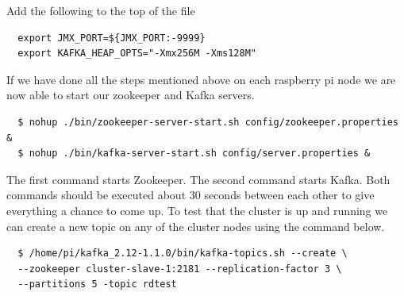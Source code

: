 Add the following to the top of the file

\begin{verbatim}
  export JMX_PORT=${JMX_PORT:-9999}
  export KAFKA_HEAP_OPTS="-Xmx256M -Xms128M"
\end{verbatim}

If we have done all the steps mentioned above on each raspberry pi node we are now able to start our zookeeper and Kafka servers.

\begin{verbatim}
  $ nohup ./bin/zookeeper-server-start.sh config/zookeeper.properties & 
  $ nohup ./bin/kafka-server-start.sh config/server.properties &
\end{verbatim}

The first command starts Zookeeper. The second command starts Kafka. Both commands should be executed about 30 seconds between each other to give everything a chance to come up. To test that the cluster is up and running we can create a new topic on any of the cluster nodes using the command below.

\begin{verbatim}
  $ /home/pi/kafka_2.12-1.1.0/bin/kafka-topics.sh --create \
  --zookeeper cluster-slave-1:2181 --replication-factor 3 \
  --partitions 5 -topic rdtest
\end{verbatim}